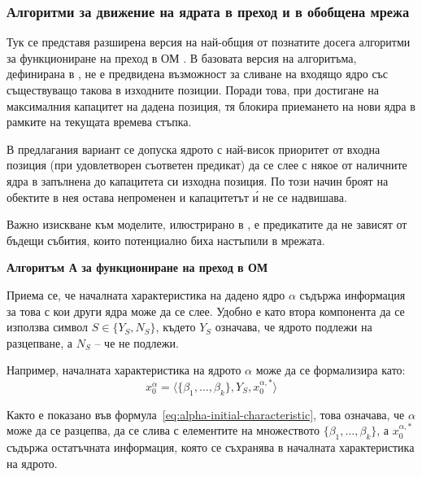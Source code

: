 \subsubsection[Алгоритми за движение на ядрата в преход и в обобщена мрежа]{Алгоритми за движение на ядрата в преход и в обобщена мрежа}\label{tokenMove}

\hspace*{2.5em}Тук се представя разширена версия на най-общия от познатите досега алгоритми за функциониране на преход в ОМ \cite{Z1, Z3, BAM, AtanassovSotirova2017}. В базовата версия на алгоритъма, дефинирана в \cite{BAM}, не е предвидена възможност за сливане на входящо ядро със съществуващо такова в изходните позиции. Поради това, при достигане на максималния капацитет на дадена позиция, тя блокира приемането на нови ядра в рамките на текущата времева стъпка.

В предлагания вариант се допуска ядрото с най-висок приоритет от входна позиция (при удовлетворен съответен предикат) да се слее с някое от наличните ядра в запълнена до капацитета си изходна позиция. По този начин броят на обектите в нея остава непроменен и капацитетът \'{и} не се надвишава.

Важно изискване към моделите, илюстрирано в \cite{Z1, Z3}, е предикатите да не зависят от бъдещи събития, които потенциално биха настъпили в мрежата.

\vspace{0.5em}

\textbf{Алгоритъм А за функциониране на преход в ОМ} 

Приема се, че началната характеристика на дадено ядро $\alpha$ съдържа информация за това с кои 
други ядра може да се слее. Удобно е като втора компонента да се използва символ 
$S \in \{Y_S, N_S\}$, където $Y_S$ означава, че ядрото подлежи на разцепване, а $N_S$ -- че не подлежи.  

Например, началната характеристика на ядрото $\alpha$ може да се формализира като:
\begin{equation}
	x^{\alpha}_0 = \langle \{\beta_1, \dots, \beta_k\}, Y_S, x^{\alpha,*}_0 \rangle 
	\label{eq:alpha-initial-characteristic}
\end{equation}

Както е показано във формула~\eqref{eq:alpha-initial-characteristic}, това означава, че $\alpha$ може да се разцепва, 
да се слива с елементите на множеството $\{\beta_1, \dots, \beta_k\}$, а $x^{\alpha,*}_0$ съдържа остатъчната информация, 
която се съхранява в началната характеристика на ядрото.

